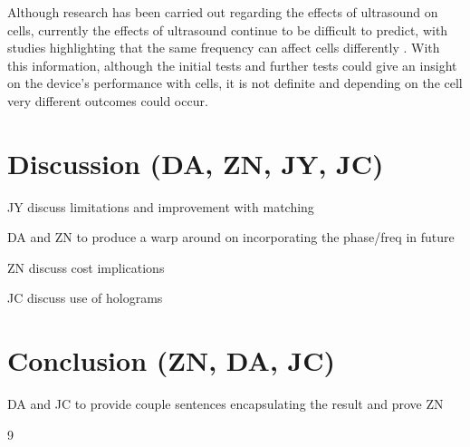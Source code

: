 \documentclass[11pt,a4paper]{article}
\begin{document}
Although research has been carried out regarding the effects of ultrasound on cells, currently the effects of ultrasound continue to be difficult to predict, with studies highlighting that the same frequency can affect cells differently \cite{Levario-Diaz2020EffectActivity}. With this information, although the initial tests and further tests could give an insight on the device's performance with cells, it is not definite and depending on the cell very different outcomes could occur.


\section{Discussion (DA, ZN, JY, JC)} 

JY discuss limitations and improvement with matching  

DA and ZN to produce a warp around on incorporating the phase/freq in future 

ZN discuss cost implications 

JC discuss use of holograms 

\section{Conclusion (ZN, DA, JC)}

DA and JC to provide couple sentences encapsulating the result and prove ZN 



\begin{thebibliography}{9}




\end{thebibliography}
\end{document}
